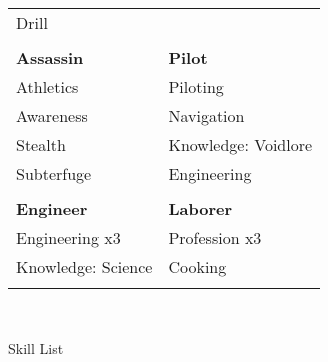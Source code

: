 \documentclass[a4paper, twocolumn, openany]{book}
\begin{document}
{{\begin{tabular}{ll}
Drill									& 									\\
\\
{\bfseries Assassin} 					& {\bfseries Pilot} 				\\
Athletics 								& Piloting 							\\
Awareness								& Navigation 						\\
Stealth									& Knowledge: Voidlore 				\\
Subterfuge								& Engineering 						\\
\\
{\bfseries Engineer} 					& {\bfseries Laborer} 				\\
Engineering x3 							& Profession x3 					\\
Knowledge: Science 						& Cooking 							\\
\\
\end{tabular}\\ }

\newpage
{\large Skill List\\}

}
\end{document}
